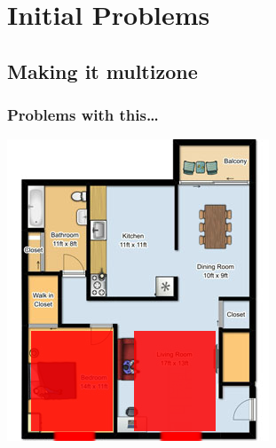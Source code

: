 \documentclass[aspectratio=169,11pt,hyperref={colorlinks=true}]{beamer}
\begin{document}
\section{Initial Problems}
\subsection{Making it multizone}
\begin{frame}
    \frametitle{Problems with this\dots}
    \begin{center}
    \includegraphics[height=.85\textheight]{floorplan-zones.png}
    \end{center}
\end{frame}
\end{document}

